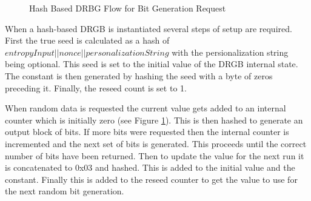 \documentclass[sigconf]{acmart}
\begin{document}
\begin{figure}[ht]
\caption{Hash Based DRBG Flow for Bit Generation Request\cite{barker2015nist90a}}
\label{fig:DRBG}
\end{figure}

When a hash-based DRGB is instantiated several steps of setup are required\cite{barker2015nist90a}. First the true seed is calculated as a hash of \\$entropyInput || nonce || personalizationString$ with the persionalization string being optional. This seed is set to the initial value of the DRGB internal state. The constant is then generated by hashing the seed with a byte of zeros preceding it. Finally, the reseed count is set to 1. 

When random data is requested the current value gets added to an internal counter which is initially zero (see Figure \ref{fig:DRBG}). This is then hashed to generate an output block of bits. If more bits were requested then the internal counter is incremented and the next set of bits is generated. This proceeds until the correct number of bits have been returned. Then to update the value for the next run it is concatenated to 0x03 and hashed. This is added to the initial value and the constant. Finally this is added to the reseed counter to get the value to use for the next random bit generation. 
\end{document}
